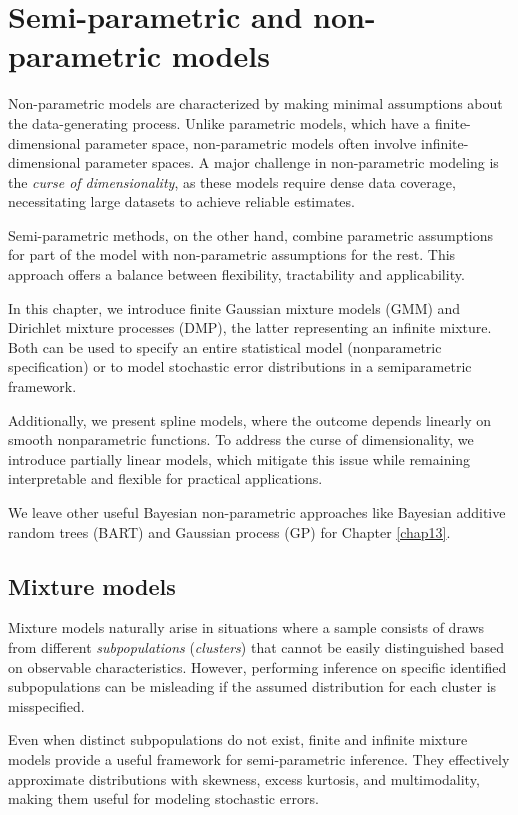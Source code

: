 \chapter{Semi-parametric and non-parametric models}\label{chap11}

Non-parametric models are characterized by making minimal assumptions about the data-generating process. Unlike parametric models, which have a finite-dimensional parameter space, non-parametric models often involve infinite-dimensional parameter spaces. A major challenge in non-parametric modeling is the \textit{curse of dimensionality}, as these models require dense data coverage, necessitating large datasets to achieve reliable estimates.

Semi-parametric methods, on the other hand, combine parametric assumptions for part of the model with non-parametric assumptions for the rest. This approach offers a balance between flexibility, tractability and applicability.

In this chapter, we introduce finite Gaussian mixture models (GMM) and Dirichlet mixture processes (DMP), the latter representing an infinite mixture. Both can be used to specify an entire statistical model (nonparametric specification) or to model stochastic error distributions in a semiparametric framework.

Additionally, we present spline models, where the outcome depends linearly on smooth nonparametric functions. To address the curse of dimensionality, we introduce partially linear models, which mitigate this issue while remaining interpretable and flexible for practical applications.

We leave other useful Bayesian non-parametric approaches like Bayesian additive random trees (BART) and Gaussian process (GP) for Chapter \ref{chap13}. 

\section{Mixture models}\label{sec11_1}
Mixture models naturally arise in situations where a sample consists of draws from different \textit{subpopulations} (\textit{clusters}) that cannot be easily distinguished based on observable characteristics. However, performing inference on specific identified subpopulations can be misleading if the assumed distribution for each cluster is misspecified.  

Even when distinct subpopulations do not exist, finite and infinite mixture models provide a useful framework for semi-parametric inference. They effectively approximate distributions with skewness, excess kurtosis, and multimodality, making them useful for modeling stochastic errors.


